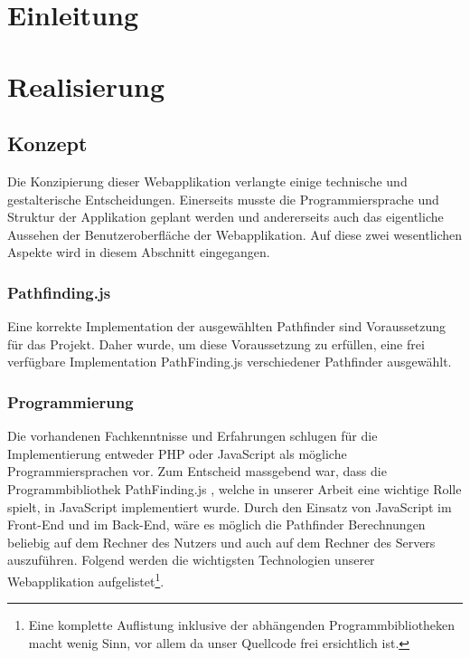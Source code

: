 \documentclass[12pt,a4paper,german]{report}
\begin{document}




\tableofcontents{}


\chapter{Einleitung}

\chapter{Realisierung}
\section{Konzept}
Die Konzipierung dieser Webapplikation verlangte einige technische und gestalterische Entscheidungen. 
Einerseits musste die Programmiersprache und Struktur der Applikation geplant werden und andererseits auch das eigentliche Aussehen der Benutzeroberfläche der Webapplikation. 
Auf diese zwei wesentlichen Aspekte wird in diesem Abschnitt eingegangen.
\subsection{Pathfinding.js}
Eine korrekte Implementation der ausgewählten Pathfinder sind Voraussetzung für das Projekt. 
Daher wurde, um diese Voraussetzung zu erfüllen, eine frei verfügbare Implementation PathFinding.js \cite{pfjs} verschiedener Pathfinder ausgewählt.
\subsection{Programmierung}
Die vorhandenen Fachkenntnisse und Erfahrungen schlugen für die Implementierung entweder PHP oder JavaScript als mögliche Programmiersprachen vor. 
Zum Entscheid massgebend war, dass die Programmbibliothek PathFinding.js \cite{pfjs}, welche in unserer Arbeit eine wichtige Rolle spielt, in JavaScript implementiert wurde. 
Durch den Einsatz von JavaScript im Front-End und im Back-End, wäre es möglich die Pathfinder Berechnungen beliebig auf dem Rechner des Nutzers und auch auf dem Rechner des Servers auszuführen. 
Folgend werden die wichtigsten Technologien unserer Webapplikation aufgelistet\footnote{Eine komplette Auflistung inklusive der abhängenden Programmbibliotheken macht wenig Sinn, vor allem da unser Quellcode frei ersichtlich ist.}.
\end{document}
